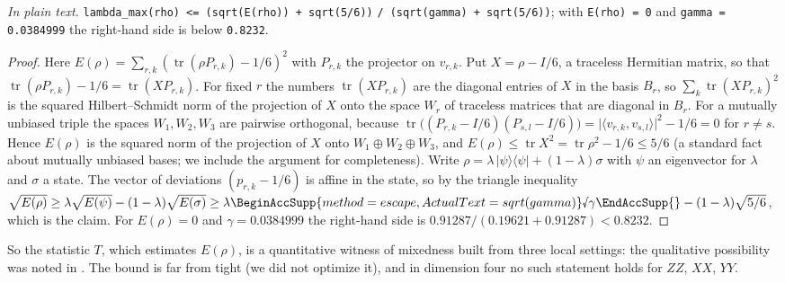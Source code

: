 \documentclass[11pt]{article}
\newcommand{\rsym}[2]{\BeginAccSupp{method=escape,ActualText=sqrt(#2)}\text{\textsurd}#1\EndAccSupp{}}
\newcommand{\ip}[2]{\langle #1,#2\rangle}
\newcommand{\abs}[1]{\lvert #1\rvert}
\newcommand{\E}{E}                       %
\theoremstyle{definition}
\theoremstyle{remark}
\begin{document}
\noindent\emph{In plain text.} \texttt{lambda\_max(rho) <= (sqrt(E(rho)) + sqrt(5/6))} \texttt{/ (sqrt(gamma) + sqrt(5/6))}; with
\texttt{E(rho) = 0} and \texttt{gamma = 0.0384999} the right-hand side is below \texttt{0.8232}.
\begin{proof}
Here $\E(\rho)=\sum_{r,k}(\operatorname{tr}(\rho P_{r,k})-1/6)^2$ with $P_{r,k}$ the projector on $v_{r,k}$. Put
$X=\rho-I/6$, a traceless Hermitian matrix, so that $\operatorname{tr}(\rho P_{r,k})-1/6=\operatorname{tr}(XP_{r,k})$.
For fixed $r$ the numbers $\operatorname{tr}(XP_{r,k})$ are the diagonal entries of $X$ in the basis $B_r$, so
$\sum_k\operatorname{tr}(XP_{r,k})^2$ is the squared Hilbert--Schmidt norm of the projection of $X$ onto the
space $W_r$ of traceless matrices that are diagonal in $B_r$. For a mutually unbiased triple the spaces
$W_1,W_2,W_3$ are pairwise orthogonal, because
$\operatorname{tr}\bigl((P_{r,k}-I/6)(P_{s,l}-I/6)\bigr)=\abs{\ip{v_{r,k}}{v_{s,l}}}^2-1/6=0$ for $r\ne s$. Hence
$\E(\rho)$ is the squared norm of the projection of $X$ onto $W_1\oplus W_2\oplus W_3$, and
$\E(\rho)\le\operatorname{tr}X^2=\operatorname{tr}\rho^2-1/6\le5/6$ (a standard fact about mutually unbiased
bases; we include the argument for completeness). Write
$\rho=\lambda\,|\psi\rangle\langle\psi|+(1-\lambda)\sigma$ with $\psi$ an eigenvector for $\lambda$ and $\sigma$ a
state. The vector of deviations $(p_{r,k}-1/6)$ is affine in the state, so by the triangle inequality
$\sqrt{\E(\rho)}\ge\lambda\sqrt{\E(\psi)}-(1-\lambda)\sqrt{\E(\sigma)}\ge\lambda\rsym{\gamma}{gamma}-(1-\lambda)\sqrt{5/6}$,
which is the claim. For $\E(\rho)=0$ and $\gamma=0.0384999$ the right-hand side is
$0.91287/(0.19621+0.91287)<0.8232$.
\end{proof}

\noindent So the statistic $T$, which estimates $\E(\rho)$, is a quantitative witness of mixedness built from
three local settings: the qualitative possibility was noted in \cite{GMMP17}. The bound is far from tight (we did
not optimize it), and in dimension four no such statement holds for $ZZ$, $XX$, $YY$.
\end{document}
